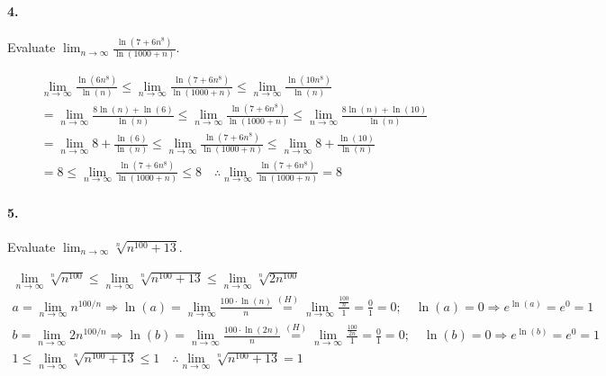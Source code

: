     \paragraph*{4.}
    Evaluate $\lim_{n \to \infty}\frac{\ln(7+6n^{8})}{\ln(1000+n)}$.
    \\
    \begin{mdframed}
        \begin{equation*}
            \begin{gathered}
                \lim_{n \to \infty}\frac{\ln(6n^{8})}{\ln(n)}   \leq
                \lim_{n \to \infty}\frac{\ln(7+6n^{8})}{\ln(1000+n)} \leq
                \lim_{n \to \infty}\frac{\ln(10n^{8})}{\ln(n)}   \\
                = \lim_{n \to \infty}\frac{8\ln(n) + \ln(6)}{\ln(n)}   \leq
                \lim_{n \to \infty}\frac{\ln(7+6n^{8})}{\ln(1000+n)} \leq
                \lim_{n \to \infty}\frac{8\ln(n) + \ln(10)}{\ln(n)}   \\
                = \lim_{n \to \infty}8 + \frac{\ln(6)}{\ln(n)}\leq
                \lim_{n \to \infty}\frac{\ln(7+6n^{8})}{\ln(1000+n)} \leq
                \lim_{n \to \infty}8 + \frac{\ln(10)}{\ln(n)}   \\
                = 8 \leq
                \lim_{n \to \infty}\frac{\ln(7+6n^{8})}{\ln(1000+n)} \leq
                8 \quad \therefore \lim_{n \to \infty}\frac{\ln(7+6n^{8})}{\ln(1000+n)} = \boxed{8}
            \end{gathered}
        \end{equation*}
    \end{mdframed}

    \paragraph*{5.}
    Evaluate $\lim_{n \to \infty}\sqrt[n]{n^{100}+13}$.
    \\
    \begin{mdframed}
        \begin{equation*}
            \begin{gathered}
                \lim_{n \to \infty}\sqrt[n]{n^{100}} \leq
                \lim_{n \to \infty}\sqrt[n]{n^{100}+13} \leq
                \lim_{n \to \infty}\sqrt[n]{2n^{100}}   \\
                a=\lim_{n \to \infty}n^{100/n} \Rightarrow \ln(a)=\lim_{n \to \infty}\frac{100\cdot\ln(n)}{n}
                \stackrel{(H)}{=}\lim_{n \to \infty}\frac{\frac{100}{n}}{1} = \frac{0}{1} = 0; \quad \ln(a) = 0 \Rightarrow e^{\ln(a)} = e^{0} = 1 \\
                b=\lim_{n \to \infty}2n^{100/n} \Rightarrow \ln(b)=\lim_{n \to \infty}\frac{100\cdot\ln(2n)}{n}
                \stackrel{(H)}{=}\lim_{n \to \infty}\frac{\frac{100}{2n}}{1} = \frac{0}{1} = 0; \quad \ln(b) = 0 \Rightarrow e^{\ln(b)} = e^{0} = 1 \\
                1 \leq
                \lim_{n \to \infty}\sqrt[n]{n^{100}+13} \leq
                1 \quad \therefore \lim_{n \to \infty}\sqrt[n]{n^{100}+13} = \boxed{1}
            \end{gathered}
        \end{equation*}
    \end{mdframed}


